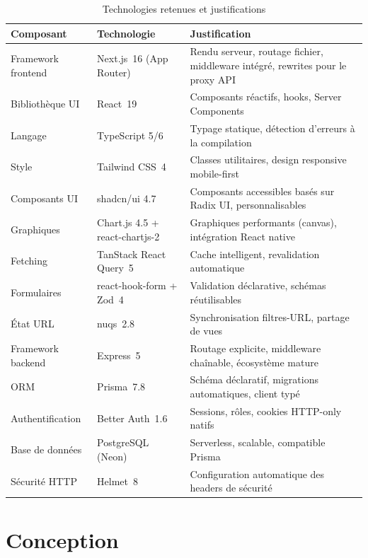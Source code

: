 \documentclass[11pt,a4paper]{report}
\begin{document}
\begin{table}[H]
\centering
\caption{Technologies retenues et justifications}
\label{tab:techno}
\renewcommand{\arraystretch}{1.3}
\begin{tabularx}{\textwidth}{@{}l l X@{}}
\toprule
\textbf{Composant} & \textbf{Technologie} & \textbf{Justification}\\
\midrule
Framework frontend & Next.js~16 (App Router) & Rendu serveur, routage fichier, middleware intégré, rewrites pour le proxy API\\
Bibliothèque UI & React~19 & Composants réactifs, hooks, Server Components\\
Langage & TypeScript 5/6 & Typage statique, détection d'erreurs à la compilation\\
Style & Tailwind CSS~4 & Classes utilitaires, design responsive mobile-first\\
Composants UI & shadcn/ui 4.7 & Composants accessibles basés sur Radix UI, personnalisables\\
Graphiques & Chart.js 4.5 + react-chartjs-2 & Graphiques performants (canvas), intégration React native\\
Fetching & TanStack React Query~5 & Cache intelligent, revalidation automatique\\
Formulaires & react-hook-form + Zod~4 & Validation déclarative, schémas réutilisables\\
État URL & nuqs~2.8 & Synchronisation filtres-URL, partage de vues\\
Framework backend & Express~5 & Routage explicite, middleware chaînable, écosystème mature\\
ORM & Prisma~7.8 & Schéma déclaratif, migrations automatiques, client typé\\
Authentification & Better Auth~1.6 & Sessions, rôles, cookies HTTP-only natifs\\
Base de données & PostgreSQL (Neon) & Serverless, scalable, compatible Prisma\\
Sécurité HTTP & Helmet~8 & Configuration automatique des headers de sécurité\\
\bottomrule
\end{tabularx}
\end{table}

\chapter{Conception}
\end{document}
